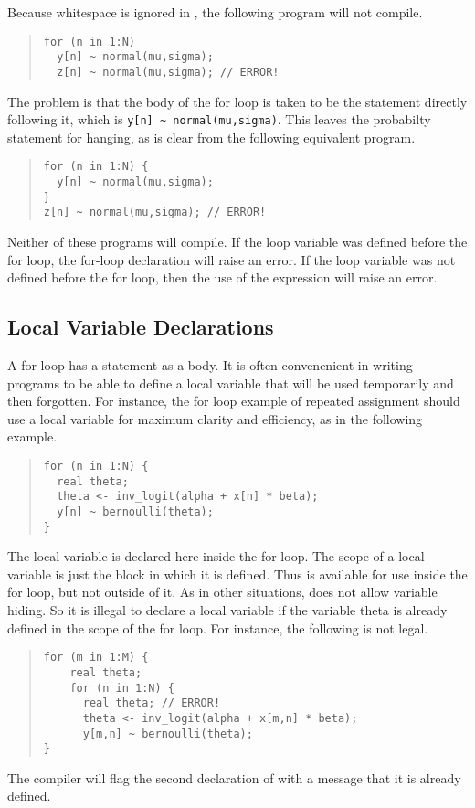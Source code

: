 Because whitespace is ignored in \Stan, the following program will
not compile.
%
\begin{quote}
\begin{Verbatim}
for (n in 1:N) 
  y[n] ~ normal(mu,sigma);
  z[n] ~ normal(mu,sigma); // ERROR!
\end{Verbatim}
\end{quote}
%
The problem is that the body of the for loop is taken to be the
statement directly following it, which is 
\Verb|y[n] ~ normal(mu,sigma)|.  This leaves the probabilty statement for
 hanging, as is clear from the following equivalent
program.
%
\begin{quote}
\begin{Verbatim}
for (n in 1:N) {
  y[n] ~ normal(mu,sigma);
}
z[n] ~ normal(mu,sigma); // ERROR!
\end{Verbatim}
\end{quote}
%
Neither of these programs will compile. If the loop variable 
was defined before the for loop, the for-loop declaration will raise
an error.  If the loop variable  was not defined before the
for loop, then the use of the expression  will raise an
error. 

\subsection{Local Variable Declarations}

A for loop has a statement as a body.  It is often convenenient in
writing programs to be able to define a local variable that will be
used temporarily and then forgotten.  For instance, the for loop
example of repeated assignment should use a local variable for maximum
clarity and efficiency, as in the following example.
%
\begin{quote}
\begin{Verbatim}
for (n in 1:N) {
  real theta;
  theta <- inv_logit(alpha + x[n] * beta);
  y[n] ~ bernoulli(theta);
}
\end{Verbatim}
\end{quote}
%
The local variable  is declared here inside the for loop.
The scope of a local variable is just the block in which it is
defined.  Thus  is available for use inside the for loop,
but not outside of it.  As in other situations, \Stan does not allow
variable hiding.  So it is illegal to declare a local variable
 if the variable theta is already defined in the scope of
the for loop.  For instance, the following is not legal.
%
\begin{quote}
\begin{Verbatim}
for (m in 1:M) {
    real theta;
    for (n in 1:N) {
      real theta; // ERROR!
      theta <- inv_logit(alpha + x[m,n] * beta);
      y[m,n] ~ bernoulli(theta);
}
\end{Verbatim}
\end{quote}
%
The compiler will flag the second declaration of  with a
message that it is already defined.

